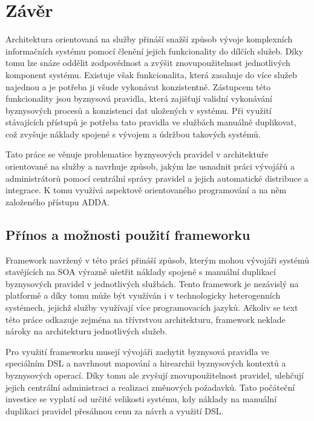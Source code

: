 

\chapter{Závěr}\label{ch:zaver}

Architektura orientovaná na služby přináší snažší způsob vývoje komplexních
informačních systému pomocí členění jejich funkcionality do dílčích služeb. Díky
tomu lze snáze oddělit zodpovědnost a zvýšit znovupoužitelnost jednotlivých
komponent systému. Existuje však funkcionalita, která zasahuje do více služeb
najednou a je potřeba ji všude vykonávat konzistentně. Zástupcem této funkcionality jsou
byznysová pravidla, která zajišťují validní vykonávání byznysových procesů
a konzistenci dat uložených v systému. Při využití stávajících přístupů je
potřeba tato pravidla ve službách manuálně duplikovat, což zvyšuje náklady
spojené s vývojem a údržbou takových systémů.

Tato práce se věnuje problematice byznysových pravidel v architektuře orientované
na služby a navrhuje způsob, jakým lze usnadnit práci vývojářů a administrátorů
pomocí centrální správy pravidel a jejich automatické distribuce a integrace.
K tomu využívá aspektově orientovaného programování a na něm založeného
přístupu \gls{ADDA}.

\section{Přínos a možnosti použití frameworku}

Framework navržený v této práci přináší způsob, kterým mohou vývojáři systémů
stavějících na \gls{SOA} výrazně ušetřit náklady spojené s manuální duplikací
byznysových pravidel v jednotlivých službách. Tento framework je nezávislý na
platformě a díky tomu může být využíván i v technologicky heterogenních systémech,
jejichž služby využívají více programovacích jazyků. Ačkoliv se text této práce odkazuje
zejména na třívrstvou architekturu, framework neklade nároky na architekturu jednotlivých
služeb.

Pro využití frameworku musejí vývojáři zachytit byznysová pravidla ve speciálním
\gls{DSL} a navrhnout mapování a hirearchii byznysových kontextů a byznysových operací.
Díky tomu ale zvyšují znovupoužitelnost pravidel, ulehčují jejich centrální administraci
a realizaci změnových požadavků. Tato počáteční investice se vyplatí od určité velikosti systému,
kdy náklady na manuální duplikaci pravidel přesáhnou cenu za návrh a využití \gls{DSL}.

